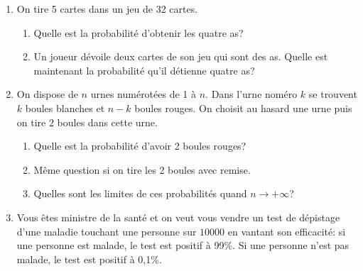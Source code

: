 \documentclass[12pt,a4paper]{article}
\begin{document}
\begin{enumerate}
%



\item On tire 5 cartes dans un jeu de 32 cartes.
\begin{enumerate}
\item Quelle est la probabilit\'e d'obtenir les quatre as?
\item Un  joueur d\'evoile deux cartes de son jeu qui sont des as. Quelle est maintenant la probabilit\'e qu'il 
d\'etienne quatre as?
\end{enumerate}

\item On dispose de $n$ urnes num\'erot\'ees de 1 \`a $n$.
Dans l'urne nom\'ero $k$ se trouvent $k$ boules blanches 
et $n-k$ boules rouges. On choisit au hasard une urne 
puis on tire 2 boules dans cette urne.
\begin{enumerate}
\item Quelle est la probabilit\'e d'avoir 2 boules rouges?
\item M\^eme question si on tire les 2 boules avec remise.
\item Quelles sont les limites de ces probabilit\'es quand 
$n\rightarrow +\infty$?
\end{enumerate}


\item
	Vous êtes ministre de la santé et on veut vous vendre un test de dépistage d'une maladie touchant une personne sur $10000$ en vantant son efficacité: si une personne est malade, le test est positif à 99\%. Si une personne n'est pas malade, le test est positif à 0,1\%.


\end{enumerate}
\end{document}

